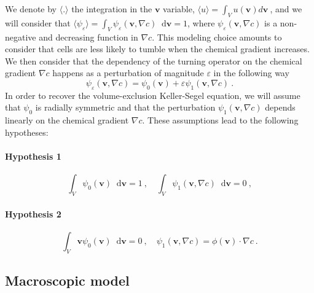 \documentclass{aims} %
\theoremstyle{definition}
\newcommand {\bv} { {\mathbf{v}} }
\newcommand*\diff{\mathop{}\!\mathrm{d}}
\begin{document}
We denote by $\langle. \rangle$ the integration in the $\mathbf{v}$ variable, $\langle u \rangle=\int_V u(\mathbf{v}) d \bv\ $, and we will consider that $\langle\psi_\varepsilon \rangle = \int_V \psi_\varepsilon (\mathbf{v},\nabla c) \diff \mathbf{v} = 1$, where $\psi_\varepsilon(\mathbf{v},\nabla c)$ is a non-negative and decreasing function in $\nabla c$. This modeling choice amounts to consider that cells are less likely to tumble when the chemical gradient increases. We then consider that the dependency of the turning operator on the chemical gradient $\nabla c$ happens as a perturbation of magnitude $\varepsilon$ in the following way
\begin{equation}\label{expansion_psi}
    \psi_\varepsilon(\mathbf{v},\nabla c)=\psi_0(\mathbf{v})+\varepsilon\psi_1(\mathbf{v},\nabla c)\ .
\end{equation}
In order to recover the volume-exclusion Keller-Segel equation, we will assume that $\psi_0$ is radially symmetric and that the perturbation $\psi_1(\mathbf{v},\nabla c)$ depends linearly on the chemical gradient $\nabla c$. These assumptions lead to the following hypotheses: 
\paragraph{Hypothesis 1}
\begin{equation}\tag{H1}
    \int_V\psi_0(\mathbf{v})\diff \mathbf{v}=1\ , \quad \int_V\psi_1(\mathbf{v},\nabla c)\diff \mathbf{v}=0\ ,\label{hypo1}
\end{equation}
\paragraph{Hypothesis 2}
\begin{equation}\tag{H2}
\int_V \mathbf{v}\psi_0(\mathbf{v})\diff \mathbf{v}=0\ , \quad \psi_1(\mathbf{v},\nabla c) = \phi(\mathbf{v}) \cdot \nabla c\ . \label{hypo2}
\end{equation}



\subsection{Macroscopic model}\label{sec:macroscopic derivation} 
\end{document}
